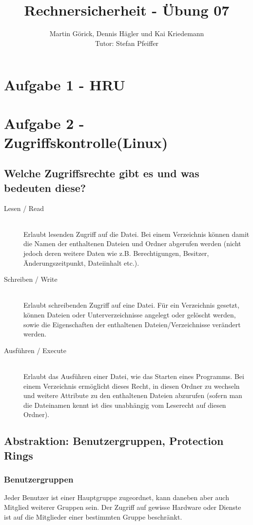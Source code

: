 \documentclass{scrartcl}
\title{Rechnersicherheit - Übung 07}
\author{Martin Görick, Dennis Hägler und Kai Kriedemann \\ Tutor: Stefan Pfeiffer}
\begin{document}
\maketitle


\section*{Aufgabe 1 - HRU}

\section*{Aufgabe 2 - Zugriffskontrolle(Linux)}
\subsection*{Welche Zugriffsrechte gibt es und was bedeuten diese?}
\begin{description}
  \item[Lesen / Read] \hfill \\
    Erlaubt lesenden Zugriff auf die Datei. Bei einem Verzeichnis können damit
    die Namen der enthaltenen Dateien und Ordner abgerufen werden (nicht jedoch
    deren weitere Daten wie z.B. Berechtigungen, Besitzer, Änderungszeitpunkt,
    Dateiinhalt etc.).
  \item[Schreiben / Write] \hfill \\
    Erlaubt schreibenden Zugriff auf eine Datei. Für ein Verzeichnis gesetzt,
    können Dateien oder Unterverzeichnisse angelegt oder gelöscht werden, sowie
    die Eigenschaften der enthaltenen Dateien/Verzeichnisse verändert werden.
  \item[Ausführen / Execute] \hfill \\
    Erlaubt das Ausführen einer Datei, wie das Starten eines Programms. Bei
    einem Verzeichnis ermöglicht dieses Recht, in diesen Ordner zu wechseln und
    weitere Attribute zu den enthaltenen Dateien abzurufen (sofern man die
    Dateinamen kennt ist dies unabhängig vom Leserecht auf diesen Ordner).
\end{description}

\subsection*{Abstraktion: Benutzergruppen, Protection Rings}
\subsubsection*{Benutzergruppen}
Jeder Benutzer ist einer Hauptgruppe zugeordnet, kann daneben aber auch
Mitglied weiterer Gruppen sein. Der Zugriff auf gewisse Hardware oder Dienste
ist auf die Mitglieder einer bestimmten Gruppe beschränkt.
\end{document}
